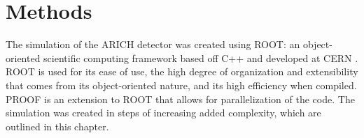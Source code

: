
\chapter{Methods}
\label{ch:Methods}

The simulation of the ARICH detector was created using \textsc{ROOT}: an object-oriented scientific computing framework based off C++ and developed at CERN \cite{root}.
\textsc{ROOT} is used for its ease of use, the high degree of organization and extensibility that comes from its object-oriented nature, and its high efficiency when compiled.
\textsc{PROOF} is an extension to \textsc{ROOT} that allows for parallelization of the code. The simulation was created in steps of increasing added complexity, which are outlined in this chapter.



